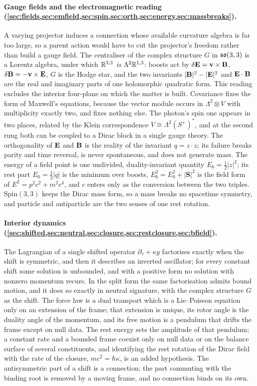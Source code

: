 \paragraph{Gauge fields and the electromagnetic reading (\cref{sec:fields,sec:emfield,sec:spin,sec:orth,sec:energy,sec:massbreaks}).} A varying
projector induces a connection whose available curvature algebra is far too large, so a parent action would have to cut
the projector's freedom rather than build a gauge field. The centraliser of the complex structure $G$ in $\mathfrak{so}(3,3)$ is a
Lorentz algebra, under which $\mathbb{R}^{3,3}$ \emph{is} $\Lambda^2\mathbb{R}^{1,3}$: boosts act by $\delta\mathbf E=\mathbf v\times\mathbf B$,
$\delta\mathbf B=-\mathbf v\times\mathbf E$, $G$ is the Hodge star, and the two invariants $|\mathbf B|^2-|\mathbf E|^2$ and $\mathbf E\cdot\mathbf B$ are the real
and imaginary parts of one holomorphic quadratic form. This reading excludes the interior four-plane on which the matter
is built. Covariance fixes the form of Maxwell's equations, because the vector module occurs in $\Lambda^2\otimes V$ with
multiplicity exactly two, and fixes nothing else. The photon's spin one appears in two places, related by the Klein
correspondence $V\cong\Lambda^2(S^+)^*$, and at the second rung both can be coupled to a Dirac block in a single gauge
theory. The orthogonality of $\mathbf E$ and $\mathbf B$ is the reality of the invariant $q=z\cdot z$; its failure breaks parity and time
reversal, is never spontaneous, and does not generate mass. The energy of a field point is one undivided, duality-invariant
quantity $E_6=\tfrac12|z|^2$; its rest part $E_0=\tfrac12|q|$ is the minimum over boosts, $E_6^2=E_0^2+|\mathbf S|^2$ is the field form of
$E^2=p^2c^2+m^2c^4$, and $c$ enters only as the conversion between the two triples. $\mathrm{Spin}(3,3)$ keeps the Dirac mass form, so
a mass breaks no spacetime symmetry, and particle and antiparticle are the two senses of one rest rotation.

\paragraph{Interior dynamics (\cref{sec:shifted,sec:neutral,sec:closure,sec:restclosure,sec:bfield}).} The Lagrangian of a single shifted operator
$\partial_\tau+\kappa g$ factorises exactly when the shift is symmetric, and then it describes an inverted oscillator; for
every constant shift some solution is unbounded, and with a positive form no solution with nonzero momentum recurs. In the
split form the same factorisation admits bound motion, and it does so exactly in neutral signature, with the complex
structure $G$ as the shift. The force law is a dual transport which is a Lie--Poisson equation only on an extension of the
frame; that extension is unique, its rotor angle is the duality angle of the momentum, and its free motion is a pendulum
that drifts the frame except on null data. The rest energy sets the amplitude of that pendulum; a constant rate and a bounded frame
coexist only on null data or on the balance surface of several constituents, and identifying the rest rotation of the Dirac field
with the rate of the closure, $mc^2=\hbar\kappa$, is an added hypothesis. The antisymmetric part of a shift is a connection: the part
commuting with the binding root is removed by a moving frame, and no connection binds on its own.

